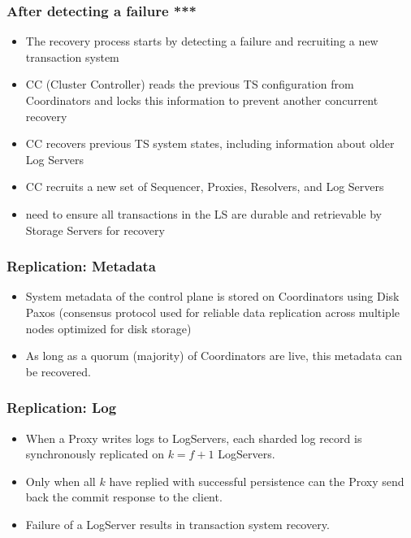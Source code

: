 \begin{frame}
	\frametitle{After detecting a failure ***}
    \begin{itemize}
        \item The recovery process starts by
detecting a failure and recruiting a new transaction system
\item CC (Cluster Controller) reads the previous TS configuration from Coordinators and locks this information
to prevent another concurrent recovery
\item CC recovers previous TS system states, including information about older
Log Servers
\item CC recruits a new set of Sequencer, Proxies, Resolvers,
and Log Servers
\item need to ensure all transactions in the LS are durable and retrievable by
Storage Servers for recovery

    \end{itemize}

\end{frame}





\begin{frame}
	\frametitle{Replication: Metadata}
    \begin{itemize}
      \item System metadata of the control plane is stored on Coordinators using Disk Paxos (consensus protocol used for reliable data replication across multiple nodes optimized for disk storage)
      \item As long as a quorum (majority) of Coordinators are live, this metadata can be recovered.

\end{itemize}
\end{frame}



\begin{frame}
	\frametitle{Replication: Log}
\begin{itemize}

      \item When a Proxy writes logs to LogServers, each sharded log record is synchronously replicated on \( k = f + 1 \) LogServers.
      \item Only when all \( k \) have replied with successful persistence can the Proxy send back the commit response to the client.
      \item Failure of a LogServer results in transaction system recovery.

\end{itemize}
\end{frame}

